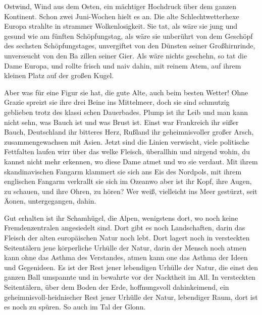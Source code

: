 

Ostwind, Wind aus dem Osten, ein mächtiger Hochdruck über
dem ganzen Kontinent. Schon zwei Juni-Wochen hielt es an.
Die alte Schlechtwetterhexe Europa strahlte in strammer
Wolkenlosigkeit. Sie tat, als wäre sie jung und ge\-sund wie
am fünften Schöpfungstag, als wäre sie unberührt von dem
Geschöpf des sechsten Schöpfungstages, unvergiftet von den
Dünsten seiner Großhirnrinde, unverseucht von den Ba\-%
zillen seiner Gier. Als wäre nichts geschehn, so tat die Dame
Europa, und rollte frisch und naiv dahin, mit reinem Atem,
auf ihrem kleinen Platz auf der großen Kugel.

Aber was für eine Figur sie hat, die gute Alte, auch beim
besten Wetter! Ohne Grazie spreizt sie ihre drei Beine ins
Mittelmeer, doch sie sind schmutzig geblieben trotz des klassi\-%
schen Dauerbades. Plump ist ihr Leib und man kann nicht
sehn, was Bauch ist und was Brust ist. Einst war Frankreich
ihr süßer Bauch, Deutschland ihr bitteres Herz, Rußland ihr
geheimnisvoller großer Arsch, zusammengewachsen mit Asien.
Jetzt sind die Linien verwischt, viele politische Fettfalten
laufen wirr über das welke Fleisch, überallhin und nirgend\-%
wohin, du kannst nicht mehr erkennen, wo diese Dame atmet
und wo sie verdaut. Mit ihrem skandinavischen Fangarm
klammert sie sich ans Eis des Nordpols, mit ihrem englischen
Fangarm verkrallt sie sich im Ozean\dp wo aber ist ihr Kopf,
ihre Augen, zu schauen, und ihre Ohren, zu hören? Wer
weiß,\eingriff{weiß, vielleicht ] weiß vielleicht}
vielleicht ins Meer gestürzt, seit Äonen, untergegangen,
dahin.

Gut erhalten ist ihr Schamhügel, die Alpen, wenigstens dort,
wo noch keine Fremdenzentralen angesiedelt sind. Dort gibt
es noch Landschaften, darin das Fleisch der alten europäischen
Natur noch lebt. Dort lagert noch in versteckten Seitentälern
jene körperliche Urhülle der Natur, darin der Mensch noch
atmen kann ohne das Asthma des Verstandes, atmen kann
one das Asthma der Ideen und Gegenideen. Es ist der Rest
jener lebendigen Urhülle der Natur, die einst den ganzen
Ball umspannte und in bewahrte vor der Nacktheit im All.
In versteckten Seitentälern, über dem Boden der Erde,
hoffnungsvoll dahinkeimend, ein geheimnisvoll-heidnischer
Rest jener Urhülle der Natur, lebendiger Raum, dort ist es
noch zu spüren. So auch im Tal der Glonn.

